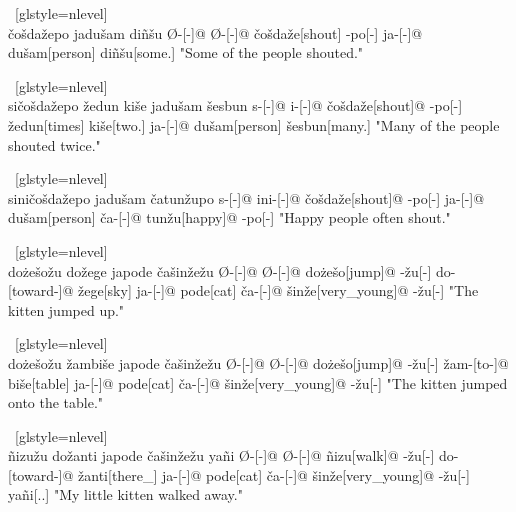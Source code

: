 \ex~[glstyle=nlevel]
\begingl
\glpreamble {} \\ \v{c}o\v{s}da\v{z}epo jadu\v{s}am diñ\v{s}u
\endpreamble
Ø-[{\Ind}-]@
Ø-[{\Pfv}-]@
\v{c}o\v{s}da\v{z}e[shout]
-po[-{\Hg}]
ja-[{\Nom}-]@
du\v{s}am[person]
diñ\v{s}u[some.{\Hg}]
\glft "Some of the people shouted."
\endgl
\xe

\ex~[glstyle=nlevel]
\begingl
\glpreamble {} \\ si\v{c}o\v{s}da\v{z}epo \v{z}edun ki\v{s}e jadu\v{s}am \v{s}esbun
\endpreamble
s-[{\Ind}-]@
i-[{\Iter}-]@
\v{c}o\v{s}da\v{z}e[shout]@
-po[-{\Hg}]
\v{z}edun[times]
ki\v{s}e[two.{\Inan}]
ja-[{\Nom}-]@
du\v{s}am[person]
\v{s}esbun[many.{\Hg}]
\glft "Many of the people shouted twice."
\endgl
\xe

\ex~[glstyle=nlevel]
\begingl
\glpreamble {} \\ sini\v{c}o\v{s}da\v{z}epo jadu\v{s}am \v{c}atun\v{z}upo
\endpreamble
s-[{\Ind}-]@
ini-[{\Hab}-]@
\v{c}o\v{s}da\v{z}e[shout]@
-po[-{\Hg}]
ja-[{\Nom}-]@
du\v{s}am[person]
\v{c}a-[{\Nom}-]@
tun\v{z}u[happy]@
-po[-{\Hg}]
\glft "Happy people often shout."
\endgl
\xe

\ex~[glstyle=nlevel]
\begingl
\glpreamble {} \\ do\.{z}e\v{s}o\v{z}u do\v{z}ege japode \v{c}a\v{s}in\v{z}e\v{z}u
\endpreamble
Ø-[{\Ind}-]@
Ø-[{\Pfv}-]@
do\.{z}e\v{s}o[jump]@
-\v{z}u[-{\An}]
do-[toward-]@
\v{z}ege[sky]
ja-[{\Nom}-]@
pode[cat]
\v{c}a-[{\Nom}-]@
\v{s}in\v{z}e[very\_young]@
-\v{z}u[-{\An}]
\glft "The kitten jumped up."
\endgl
\xe

\ex~[glstyle=nlevel]
\begingl
\glpreamble {} \\ do\.{z}e\v{s}o\v{z}u \v{z}ambi\v{s}e japode \v{c}a\v{s}in\v{z}e\v{z}u
\endpreamble
Ø-[{\Ind}-]@
Ø-[{\Pfv}-]@
do\.{z}e\v{s}o[jump]@
-\v{z}u[-{\An}]
\v{z}am-[to-]@
bi\v{s}e[table]
ja-[{\Nom}-]@
pode[cat]
\v{c}a-[{\Nom}-]@
\v{s}in\v{z}e[very\_young]@
-\v{z}u[-{\An}]
\glft "The kitten jumped onto the table."
\endgl
\xe

\ex~[glstyle=nlevel]
\begingl
\glpreamble {} \\ ñizu\v{z}u do\v{z}anti japode \v{c}a\v{s}in\v{z}e\v{z}u yañi
\endpreamble
Ø-[{\Ind}-]@
Ø-[{\Pfv}-]@
ñizu[walk]@
-\v{z}u[-{\An}]
do-[toward-]@
\v{z}anti[there\_{\Dist}]
ja-[{\Nom}-]@
pode[cat]
\v{c}a-[{\Nom}-]@
\v{s}in\v{z}e[very\_young]@
-\v{z}u[-{\An}]
yañi[{\Fex}.{\Hg}.{\Gen}]
\glft "My little kitten walked away."
\endgl
\xe

